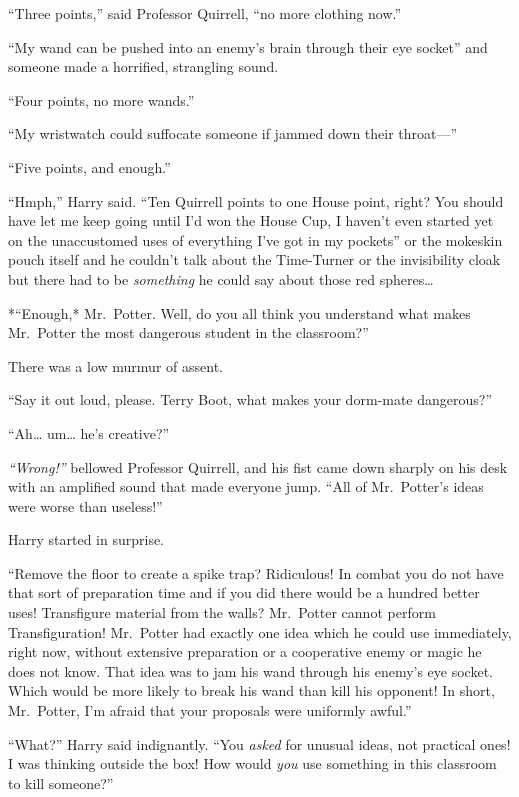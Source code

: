 ``Three points,'' said Professor Quirrell, ``no more clothing now.''

``My wand can be pushed into an enemy's brain through their eye socket''
and someone made a horrified, strangling sound.

``Four points, no more wands.''

``My wristwatch could suffocate someone if jammed down their throat---''

``Five points, and enough.''

``Hmph,'' Harry said. ``Ten Quirrell points to one House point, right?
You should have let me keep going until I'd won the House Cup, I haven't
even started yet on the unaccustomed uses of everything I've got in my
pockets'' or the mokeskin pouch itself and he couldn't talk about the
Time-Turner or the invisibility cloak but there had to be
\emph{something} he could say about those red spheres\ldots{}

*``Enough,* Mr.~Potter. Well, do you all think you understand what makes
Mr.~Potter the most dangerous student in the classroom?''

There was a low murmur of assent.

``Say it out loud, please. Terry Boot, what makes your dorm-mate
dangerous?''

``Ah\ldots{} um\ldots{} he's creative?''

\emph{``Wrong!''} bellowed Professor Quirrell, and his fist came down
sharply on his desk with an amplified sound that made everyone jump.
``All of Mr.~Potter's ideas were worse than useless!''

Harry started in surprise.

``Remove the floor to create a spike trap? Ridiculous! In combat you do
not have that sort of preparation time and if you did there would be a
hundred better uses! Transfigure material from the walls? Mr.~Potter
cannot perform Transfiguration! Mr.~Potter had exactly one idea which he
could use immediately, right now, without extensive preparation or a
cooperative enemy or magic he does not know. That idea was to jam his
wand through his enemy's eye socket. Which would be more likely to break
his wand than kill his opponent! In short, Mr.~Potter, I'm afraid that
your proposals were uniformly awful.''

``What?'' Harry said indignantly. ``You \emph{asked} for unusual ideas,
not practical ones! I was thinking outside the box! How would \emph{you}
use something in this classroom to kill someone?''

